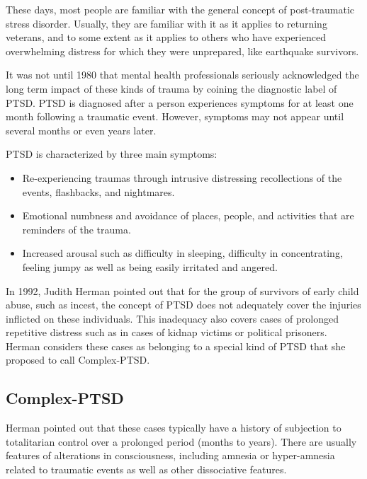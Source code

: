 \documentclass[]{book}
\begin{document}
These days, most people are familiar with the general concept of post-traumatic stress disorder. Usually, they are familiar with it as it applies to returning veterans, and to some extent as it applies to others who have experienced overwhelming distress for which they were unprepared, like earthquake survivors.

It was not until 1980 that mental health professionals seriously acknowledged the long term impact of these kinds of trauma by coining the diagnostic label of PTSD. PTSD is diagnosed after a person experiences symptoms for at least one month following a traumatic event. However, symptoms may not appear until several months or even years later.

PTSD is characterized by three main symptoms:

\begin{itemize}
\item
  Re-experiencing traumas through intrusive distressing recollections of the events, flashbacks, and nightmares.
\item
  Emotional numbness and avoidance of places, people, and activities that are reminders of the trauma.
\item
  Increased arousal such as difficulty in sleeping, difficulty in concentrating, feeling jumpy as well as being easily irritated and angered.
\end{itemize}

In 1992, Judith Herman pointed out that for the group of survivors of early child abuse, such as incest, the concept of PTSD does not adequately cover the injuries inflicted on these individuals. This inadequacy also covers cases of prolonged repetitive distress such as in cases of kidnap victims or political prisoners. Herman considers these cases as belonging to a special kind of PTSD that she proposed to call Complex-PTSD.

\hypertarget{complex-ptsd}{%
\subsection*{Complex-PTSD}\label{complex-ptsd}}

Herman pointed out that these cases typically have a history of subjection to totalitarian control over a prolonged period (months to years). There are usually features of alterations in consciousness, including amnesia or hyper-amnesia related to traumatic events as well as other dissociative features.
\end{document}
